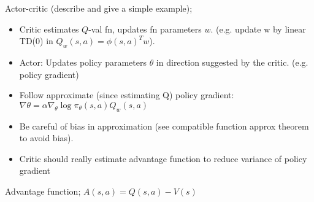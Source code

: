 \documentclass{article}
\begin{document}
Actor-critic (describe and give a simple example);\begin{itemize} \item Critic estimates $Q$-val fn, updates fn parameters $w$. (e.g. update w by linear TD(0) in $Q_w(s,a)=\phi(s,a)^Tw$). \item Actor: Updates policy parameters $\theta$ in direction suggested by the critic. (e.g. policy gradient) \item Follow approximate (since estimating Q) policy gradient: $\nabla\theta = \alpha\nabla_{\theta}\log\pi_\theta(s,a)Q_w(s,a)$ \item Be careful of bias in approximation (see compatible function approx theorem to avoid bias). \item Critic should really estimate advantage function to reduce variance of policy gradient \end{itemize}

Advantage function; $A(s,a)=Q(s,a)-V(s)$
\end{document}
